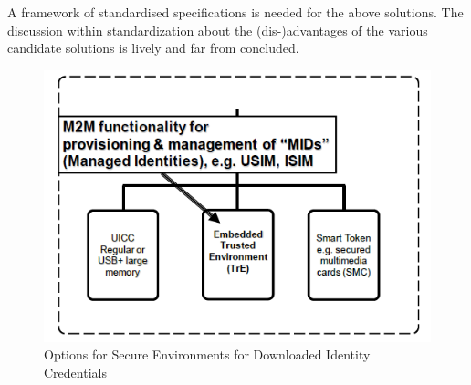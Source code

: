 \documentclass[12pt]{article}
\begin{document}
A framework of standardised specifications is needed for the above solutions. The discussion within standardization about the (dis-)advantages of the various candidate solutions is lively and far from concluded.

\begin{figure}[!t]
\centering
    \includegraphics[scale=0.8]{tre}
    \caption{Options for Secure Environments for Downloaded Identity Credentials}
    \label{tre}
\label{adhoc}

\end{figure}
\end{document}
